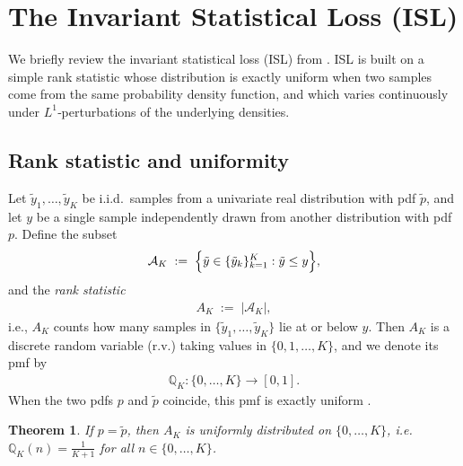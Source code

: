 \documentclass{article}
\newtheorem{theorem}{Theorem}[section]
\begin{document}
\section{The Invariant Statistical Loss (ISL)} \label{section: preliminaries}

We briefly review the invariant statistical loss (ISL) from \cite{de2024training}.  ISL is built on a simple rank statistic whose distribution is exactly uniform when two samples come from the same probability density function, and which varies continuously under $L^1$‐perturbations of the underlying densities.

\subsection{Rank statistic and uniformity}\label{sec:rank}

Let $\tilde y_1,\dots,\tilde y_K$ be i.i.d.\ samples from a univariate real distribution with pdf $\tilde{p}$, and let $y$ be a single sample independently drawn from another distribution with pdf $p$. Define the subset
\begin{align*}
\mathcal{A}_{K} 
\;:=\; 
\Bigl\{\tilde{y} \in \{\tilde{y}_{k}\}_{k=1}^{K} : \tilde{y} \leq y\Bigr\},
\end{align*}
and the \emph{rank statistic}
\begin{align}\label{eq: rank statistic}
     A_{K} 
     \;:=\; 
     \bigl|\mathcal{A}_{K}\bigr|,
 \end{align}
 i.e., $A_{K}$ counts how many samples in $\{\tilde{y}_1,\ldots,\tilde{y}_K\}$ lie at or below $y$. Then $A_{K}$ is a discrete random variable (r.v.) taking values in $\{0,1,\ldots,K\}$, and we denote its pmf by 
 \begin{align*}
     \mathbb{Q}_K:\{0,\ldots,K\}\to[0,1].
 \end{align*}
When the two pdfs $p$ and $\tilde{p}$ coincide, this pmf is exactly uniform \cite{de2024training}.
\begin{theorem}\label{thm:uniformity}
If $p = \tilde{p}$, then $A_{K}$ is uniformly distributed on $\{0,\ldots,K\}$, i.e.\ $\mathbb{Q}_{K}(n)=\tfrac{1}{K+1}$ for all $n \in \{0,\ldots,K\}$.
\end{theorem}
\end{document}
